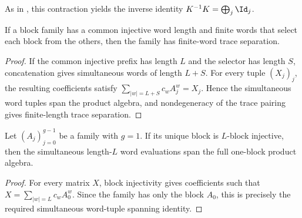 \begin{tenkzequation}
\begin{tenkz}[rows={wire,wire,wire}, cols=3, bonds=none]
        \tn[at=(3,3), name=qXinv,
            ports={180:virtual, 0:virtual, 90:virtual}]{}
    \end{tenkz}
\end{tenkzequation}
As in \cite[Appendix~C.2, lines~1666--1670]{Cirac2016MPDO_arXiv}, this
contraction yields the inverse identity $K^{-1}K=\bigoplus_j\Id_j$.

\begin{lemma}
    \label{thm:propblockinj_abstract}
    \leanok
    If a block family has a common injective word length and finite words that
    select each block from the others, then the family has finite-word trace
    separation.
\end{lemma}

\begin{proof}
    \leanok
    If the common injective prefix has length $L$ and the selector has length
    $S$, concatenation gives simultaneous words of length $L+S$. For every
    tuple $(X_j)_j$, the resulting coefficients satisfy
    $\sum_{|w|=L+S}c_w A_j^w=X_j$.
    Hence the simultaneous word tuples span the product algebra, and
    nondegeneracy of the trace pairing gives finite-length trace separation.
\end{proof}

\begin{lemma}
    \label{lem:single_block_word_tuple_span}
    \leanok
    Let $(A_j)_{j=0}^{g-1}$ be a family with $g=1$. If its unique block is
    $L$-block injective, then the simultaneous length-$L$ word evaluations
    span the full one-block product algebra.
\end{lemma}

\begin{proof}
    \leanok
    For every matrix $X$, block injectivity gives coefficients such that
    $X=\sum_{|w|=L}c_wA_0^w$.
    Since the family has only the block $A_0$, this is precisely the required
    simultaneous word-tuple spanning identity.
\end{proof}
